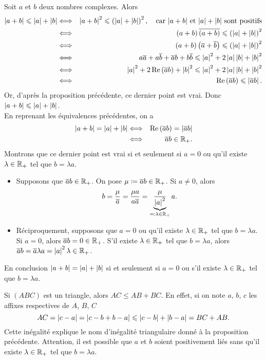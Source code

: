 \documentclass{magnolia}
\begin{document}
\begin{preuve}
Soit $a$ et $b$ deux nombres complexes. Alors
\begin{eqnarray*}
\left|a+b\right|\leqslant\left|a\right|+\left|b\right|
&\Longleftrightarrow& \left|a+b\right|^2\leqslant\left(\left|a\right|+\left|b\right|\right)^2, \quad\text{car $\left|a+b\right|$ et $\left|a\right|+\left|b\right|$ sont positifs}\\
&\Longleftrightarrow& \left(a+b\right)\overline{\left(a+b\right)}\leqslant\left(\left|a\right|+\left|b\right|\right)^2\\
&\Longleftrightarrow& \left(a+b\right)\left(\overline{a}+\overline{b}\right)\leqslant\left(\left|a\right|+\left|b\right|\right)^2\\
&\Longleftrightarrow& a\overline{a}+a\overline{b}+\overline{a}b+b\overline{b}\leqslant\left|a\right|^2+2\left|a\right|\left|b\right|+\left|b\right|^2\\
&\Longleftrightarrow& \left|a\right|^2+2\mathop{\rm Re}\left(\overline{a}b\right)+\left|b\right|^2\leqslant\left|a\right|^2+2\left|a\right|\left|b\right|+\left|b\right|^2\\
&\Longleftrightarrow& \mathop{\rm Re}\left(\overline{a}b\right)\leqslant \left|\overline{a}b\right|.
\end{eqnarray*}
Or, d'après la proposition précédente, ce dernier point est vrai. Donc $\left|a+b\right|\leqslant\left|a\right|+\left|b\right|$.\\

En reprenant les équivalences précédentes, on a
\begin{eqnarray*}
\left|a+b\right|=\left|a\right|+\left|b\right|
&\Longleftrightarrow& \mathop{\rm Re}\left(\overline{a}b\right)= \left|\overline{a}b\right|\\
&\Longleftrightarrow& \overline{a}b\in\mathbb{R}_+.
\end{eqnarray*}
Montrons que ce dernier point est vrai si et seulement si $a=0$ ou qu'il existe $\lambda\in\mathbb{R}_+$ tel que $b=\lambda a$.
\begin{itemize}
\item Supposons que $\overline{a}b\in\mathbb{R}_+$. On pose $\mu\coloneqq\overline{a}b\in\mathbb{R}_+$. Si $a\neq 0$, alors
\[b=\frac{\mu}{\overline{a}}=\frac{\mu a}{a\overline{a}}=\underbrace{\frac{\mu}{\left|a\right|^2}}_{\eqqcolon\lambda\in\mathbb{R}_+}a.\]
\item Réciproquement, supposons que $a=0$ ou qu'il existe $\lambda\in\mathbb{R}_+$ tel que $b=\lambda a$. Si $a=0$, alors $\overline{a}b=0\in\mathbb{R}_+$. S'il existe $\lambda\in\mathbb{R}_+$ tel que $b=\lambda a$, alors $\overline{a}b=\overline{a}\lambda a=\left|a\right|^2 \lambda\in\mathbb{R}_+$.
\end{itemize}
En conclusion $\left|a+b\right|=\left|a\right|+\left|b\right|$ si et seulement si $a=0$ ou s'il existe $\lambda\in\mathbb{R}_+$ tel que $b=\lambda a$.
\end{preuve}

\begin{remarques}
\remarque Si $(ABC)$ est un triangle, alors $AC\leq AB+BC$. En effet, si on note $a$, $b$, $c$ les affixes respectives de $A$, $B$, $C$
\[AC=\left|c-a\right|=\left|c-b+b-a\right|\leqslant\left|c-b\right|+\left|b-a\right|=BC+AB.\]
Cette inégalité explique le nom d'inégalité triangulaire donné à la proposition précédente.
\remarque Attention, il est possible que $a$ et $b$ soient positivement liés sans
  qu'il existe $\lambda\in\mathbb{R}_+$ tel que $b=\lambda a$.
\end{remarques}
\end{document}
